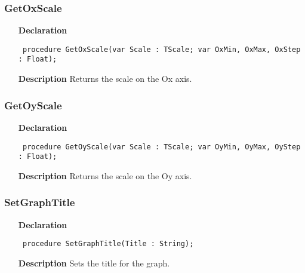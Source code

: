 \documentclass[12pt,a4paper,oneside]{report}
\newcommand{\declarationitem}[1]{\textbf{#1}}
\newcommand{\descriptiontitle}[1]{\textbf{#1}}
\newcommand{\code}[1]{\texttt{#1}}
\begin{document}
\subsubsection{GetOxScale}
\label{uplot-GetOxScale}
\begin{itemize}\item[\declarationitem{Declaration}\hfill]
	\begin{flushleft}
		\code{
			procedure GetOxScale(var Scale : TScale; var OxMin, OxMax, OxStep : Float);}
		
	\end{flushleft}
	
	\par
	\item[\descriptiontitle{Description}]
	Returns the scale on the Ox axis.
	
\end{itemize}
\subsubsection{GetOyScale}
\label{uplot-GetOyScale}
\begin{itemize}\item[\declarationitem{Declaration}\hfill]
	\begin{flushleft}
		\code{
			procedure GetOyScale(var Scale : TScale; var OyMin, OyMax, OyStep : Float);}
		
	\end{flushleft}
	
	\par
	\item[\descriptiontitle{Description}]
	Returns the scale on the Oy axis.
	
\end{itemize}
\subsubsection{SetGraphTitle}
\label{uplot-SetGraphTitle}
\begin{itemize}\item[\declarationitem{Declaration}\hfill]
	\begin{flushleft}
		\code{
			procedure SetGraphTitle(Title : String);}
		
	\end{flushleft}
	
	\par
	\item[\descriptiontitle{Description}]
	Sets the title for the graph.
	
\end{itemize}
\end{document}
